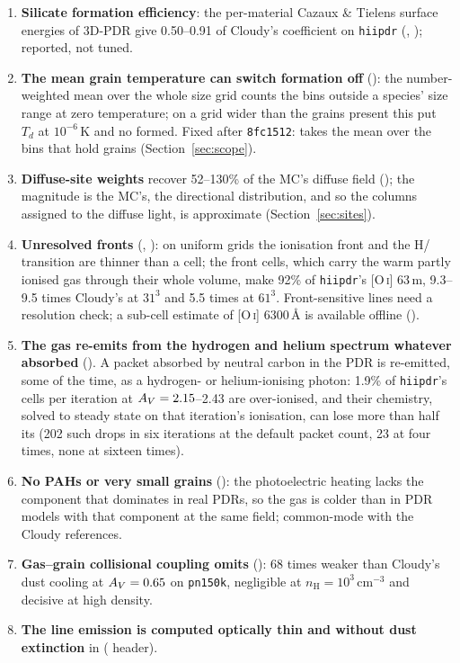 \begin{enumerate}
\item \textbf{Silicate formation efficiency}: the per-material Cazaux \& Tielens
  surface energies of 3D-PDR give 0.50--0.91 of Cloudy's coefficient on
  \texttt{hiipdr} (, ); reported, not tuned.
\item \textbf{The mean grain temperature can switch formation off}
  (): the number-weighted mean over the whole size grid counts the
  bins outside a species' size range at zero temperature; on a grid wider
  than the grains present this put $T_d$ at $10^{-6}$\,K and no \Htwo{} formed.
  Fixed after \texttt{8fc1512}:  takes the mean over the bins that hold
  grains (Section~\ref{sec:scope}).
\item \textbf{Diffuse-site weights} recover 52--130\% of the MC's diffuse field
  (); the magnitude is the MC's, the directional distribution, and so
  the columns assigned to the diffuse light, is approximate
  (Section~\ref{sec:sites}).
\item \textbf{Unresolved fronts} (, ): on uniform grids
  the ionisation front and the H/\Htwo{} transition are thinner than a cell; the
  front cells, which carry the warm partly ionised gas through their whole
  volume, make 92\% of \texttt{hiipdr}'s [O\,\textsc{i}] 63\,\textmu m, 9.3--9.5 times
  Cloudy's at $31^3$ and 5.5 times at $61^3$. Front-sensitive lines need a
  resolution check; a sub-cell estimate of [O\,\textsc{i}] 6300\,\AA{} is available
  offline ().
\item \textbf{The gas re-emits from the hydrogen and helium spectrum whatever
  absorbed} (). A packet absorbed by neutral carbon in the PDR is
  re-emitted, some of the time, as a hydrogen- or helium-ionising photon:
  1.9\% of \texttt{hiipdr}'s cells per iteration at $A_{V}=2.15$--2.43 are
  over-ionised, and their chemistry, solved to steady state on that iteration's
  ionisation, can lose more than half its \Htwo{} (202 such drops in six
  iterations at the default packet count, 23 at four times, none at sixteen
  times).
\item \textbf{No PAHs or very small grains} (): the photoelectric
  heating lacks the component that dominates in real PDRs, so the gas is colder
  than in PDR models with that component at the same field; common-mode with
  the Cloudy references.
\item \textbf{Gas--grain collisional coupling omits \Htwo} (): 68
  times weaker than Cloudy's dust cooling at $A_{V}=0.65$ on \texttt{pn150k},
  negligible at $n_{\mathrm H}=10^3$\,cm$^{-3}$ and decisive at high density.
\item \textbf{The \Htwo{} line emission is computed optically thin and without
  dust extinction} in  ( header).
\end{enumerate}

